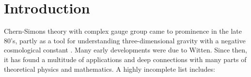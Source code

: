 \documentclass[12pt]{article}
\begin{document}
\thispagestyle{empty}
\documentheader
\newcommand{\CalA}{\mathcal{A}}
\newcommand{\CalB}{\mathcal{B}}
\newcommand{\CalH}{\mathcal{H}}
\newcommand{\CalJ}{\mathcal{J}}
\newcommand{\CalL}{\mathcal{L}}
\newcommand{\CalM}{\mathcal{M}}
\newcommand{\CalN}{\mathcal{N}}
\newcommand{\CalO}{\mathcal{O}}
\newcommand{\CalP}{\mathcal{P}}
\newcommand{\CalS}{\mathcal{S}}
\newcommand{\CalZ}{\mathcal{Z}}

\newcommand{\BZ}{{\mathbb Z}}
\newcommand{\BR}{{\mathbb R}}
\newcommand{\BC}{{\mathbb C}}
\newcommand{\BQ}{{\mathbb Q}}

\newcommand{\Tr}{{\rm Tr \,}}

\else 
\chapterheader 
\fi



\newcommand{\DIbe}{\begin{equation}}
\newcommand{\DIee}{\end{equation}}
\newcommand{\mb}{\mathbf}

\newcommand{\wh}{\widehat}
\newcommand{\ol}{\overline}
\newcommand{\ds}{\displaystyle}
\newcommand{\DIeg}{\emph{e.g.}}
\newcommand{\DIie}{\emph{i.e.}}
\newcommand{\DIcf}{\emph{cf.}}
\newcommand{\cp}{{\mathbb{CP}}}


\newcommand{\bs}{\backslash}
\newcommand{\pd}{\partial}








\section{Introduction}

Chern-Simons theory with complex gauge group came to prominence in the late 80's, partly as a tool for understanding three-dimensional gravity with a negative cosmological constant \cite{DIAT-CSgrav, DIWitten-gravCS, DIWitten-top, DIWitten-cx}.
Many early developments were due to Witten.
Since then, it has found a multitude of applications and deep connections with many parts of theoretical physics and mathematics. A highly incomplete list includes:
\end{document}

